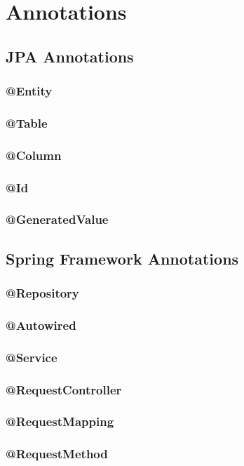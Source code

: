 \documentclass{report}
\begin{document}
	\section{Annotations}
	\subsection{JPA Annotations}
	\subsubsection{@Entity}
	\subsubsection{@Table}
	\subsubsection{@Column}
	\subsubsection{@Id}
	\subsubsection{@GeneratedValue}
	\subsection{Spring Framework Annotations}
	\subsubsection{@Repository}
	\subsubsection{@Autowired}
	\subsubsection{@Service}
	\subsubsection{@RequestController}
	\subsubsection{@RequestMapping}
	\subsubsection{@RequestMethod}
\end{document}
